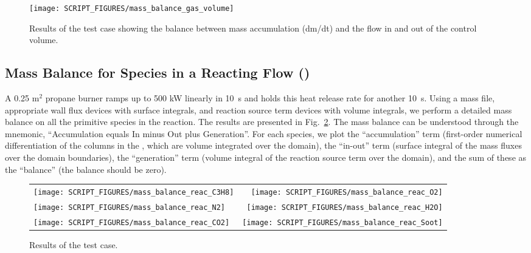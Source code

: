 \documentclass[11pt]{book}
\begin{document}
\begin{figure}[ht]
\centering
\texttt{[image: SCRIPT\_FIGURES/mass\_balance\_gas\_volume]}
\caption[The  test case]{Results of the  test case showing the balance between mass accumulation (dm/dt) and the flow in and out of the control volume.}
\label{fig:mass_balance_gas_volume}
\end{figure}

\subsection{Mass Balance for Species in a Reacting Flow (\texorpdfstring{}{mass\_balance\_reac})}
\label{mass_balance_reac}

A 0.25 m$^2$ propane burner ramps up to 500 kW linearly in 10~s and holds this heat release rate for another 10~s.  Using a mass file, appropriate wall flux devices with surface integrals, and reaction source term devices with volume integrals, we perform a detailed mass balance on all the primitive species in the reaction.  The results are presented in Fig.~\ref{fig:mass_balance_reac}.  The mass balance can be understood through the mnemonic, ``Accumulation equals In minus Out plus Generation''.  For each species, we plot the ``accumulation'' term (first-order numerical differentiation of the columns in the , which are volume integrated over the domain), the ``in-out'' term (surface integral of the mass fluxes over the domain boundaries), the ``generation'' term (volume integral of the reaction source term over the domain), and the sum of these as the ``balance'' (the balance should be zero).

\begin{figure}[ht]
\begin{tabular*}{\textwidth}{lr}
\texttt{[image: SCRIPT\_FIGURES/mass\_balance\_reac\_C3H8]} &
\texttt{[image: SCRIPT\_FIGURES/mass\_balance\_reac\_O2]}   \\
\texttt{[image: SCRIPT\_FIGURES/mass\_balance\_reac\_N2]}   &
\texttt{[image: SCRIPT\_FIGURES/mass\_balance\_reac\_H2O]}  \\
\texttt{[image: SCRIPT\_FIGURES/mass\_balance\_reac\_CO2]}  &
\texttt{[image: SCRIPT\_FIGURES/mass\_balance\_reac\_Soot]}
\end{tabular*}
\caption[The  test case]{Results of the  test case.}
\label{fig:mass_balance_reac}
\end{figure}
\end{document}
